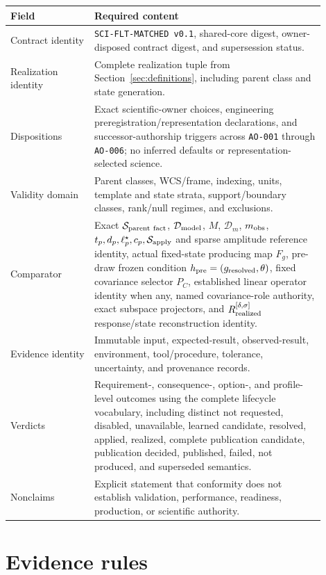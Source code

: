 \documentclass[10pt]{article}
\begin{document}
\begin{longtable}{p{0.24\linewidth}p{0.66\linewidth}}
\toprule
Field & Required content \\
\midrule
\endhead
Contract identity & \texttt{SCI-FLT-MATCHED v0.1}, shared-core digest, owner-
disposed contract digest, and supersession status. \\
Realization identity & Complete realization tuple from
Section~\ref{sec:definitions}, including parent class and state generation. \\
Dispositions & Exact scientific-owner choices, engineering
preregistration/representation declarations, and successor-authorship triggers
across \texttt{AO-001} through \texttt{AO-006}; no inferred defaults or
representation-selected science. \\
Validity domain & Parent classes, WCS/frame, indexing, units, template and
state strata, support/boundary classes, rank/null regimes, and exclusions. \\
Comparator & Exact $\mathcal S_{\rm parent\ fact}$,
$\mathcal D_{\rm model}$, $M$, $\mathcal D_m$, $m_{\rm obs}$,
$t_p,d_p,\ell_p^\star,c_p,
\mathcal S_{\rm apply}$ and sparse amplitude reference identity, actual
fixed-state producing map $F_g$, pre-draw frozen condition
$h_{\rm pre}=(g_{\rm resolved},\theta)$, fixed covariance selector
$P_C$, established linear operator identity when any, named covariance-role
authority, exact subspace projectors, and
$R_{\rm realized}^{[\delta,\sigma]}$ response/state reconstruction identity. \\
Evidence identity & Immutable input, expected-result, observed-result,
environment, tool/procedure, tolerance, uncertainty, and provenance records. \\
Verdicts & Requirement-, consequence-, option-, and profile-level outcomes using
the complete lifecycle vocabulary, including distinct \textsf{not requested},
\textsf{disabled}, \textsf{unavailable}, \textsf{learned candidate},
\textsf{resolved}, \textsf{applied}, \textsf{realized},
\textsf{complete publication candidate}, \textsf{publication decided}, \textsf{published},
\textsf{failed}, \textsf{not produced}, and \textsf{superseded} semantics. \\
Nonclaims & Explicit statement that conformity does not establish validation,
performance, readiness, production, or scientific authority. \\
\bottomrule
\end{longtable}

\section{Evidence rules}
\end{document}
